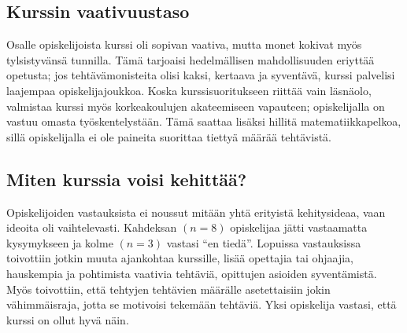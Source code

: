 \subsection{Kurssin vaativuustaso}
Osalle opiskelijoista kurssi oli sopivan vaativa, mutta monet kokivat myös tylsistyvänsä tunnilla.
Tämä tarjoaisi hedelmällisen mahdollisuuden eriyttää opetusta; jos tehtävämonisteita olisi kaksi, kertaava ja syventävä, kurssi palvelisi laajempaa opiskelijajoukkoa.
Koska kurssisuoritukseen riittää vain läsnäolo, valmistaa kurssi myös korkeakoulujen akateemiseen vapauteen; opiskelijalla on vastuu omasta työskentelystään.
Tämä saattaa lisäksi hillitä matematiikkapelkoa, sillä opiskelijalla ei ole paineita suorittaa tiettyä määrää tehtävistä.

\subsection{Miten kurssia voisi kehittää?}
Opiskelijoiden vastauksista ei noussut mitään yhtä erityistä kehitysideaa, vaan ideoita oli vaihtelevasti. Kahdeksan $(n=8)$ opiskelijaa jätti vastaamatta kysymykseen ja kolme $(n=3)$ vastasi ``en tiedä''. Lopuissa vastauksissa toivottiin jotkin muuta ajankohtaa kurssille, lisää opettajia tai ohjaajia, hauskempia ja pohtimista vaativia tehtäviä, opittujen asioiden syventämistä. Myös toivottiin, että tehtyjen tehtävien määrälle asetettaisiin jokin vähimmäisraja, jotta se motivoisi tekemään tehtäviä. Yksi opiskelija vastasi, että kurssi on ollut hyvä näin. 



